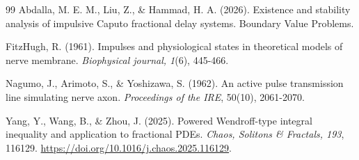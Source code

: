 \documentclass[12pt,a4paper]{article}
\numberwithin{equation}{section}
\begin{document}
\begin{thebibliography}{99}
	Abdalla, M. E. M., Liu, Z., \& Hammad, H. A. (2026). Existence and stability analysis of impulsive Caputo fractional delay systems. Boundary Value Problems. 
	
	FitzHugh, R. (1961). Impulses and physiological states in theoretical models of nerve membrane. \emph{Biophysical journal, 1}(6), 445-466.
	
	Nagumo, J., Arimoto, S., \& Yoshizawa, S. (1962). An active pulse transmission line simulating nerve axon. \textit{Proceedings of the IRE}, 50(10), 2061-2070.
	
	Yang, Y., Wang, B., \& Zhou, J. (2025). Powered Wendroff-type integral inequality and application to fractional PDEs. \emph{Chaos, Solitons \& Fractals, 193}, 116129. \url{https://doi.org/10.1016/j.chaos.2025.116129}.
	
\end{thebibliography}
	
\end{document}

